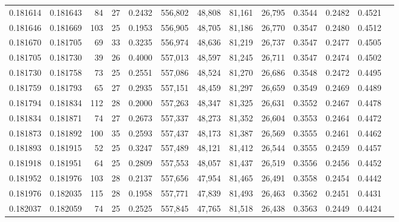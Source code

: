\begin{tabular}{rrrrrrrrrrrrr}
0.181614 & 0.181643 &  84 &  27 &                                     0.2432 & 556,802 &  48,808 &  81,161 &  26,795 & 0.3544 & 0.2482 & 0.4521 \\
0.181646 & 0.181669 & 103 &  25 &                                     0.1953 & 556,905 &  48,705 &  81,186 &  26,770 & 0.3547 & 0.2480 & 0.4512 \\
0.181670 & 0.181705 &  69 &  33 &                                     0.3235 & 556,974 &  48,636 &  81,219 &  26,737 & 0.3547 & 0.2477 & 0.4505 \\
0.181705 & 0.181730 &  39 &  26 &                                     0.4000 & 557,013 &  48,597 &  81,245 &  26,711 & 0.3547 & 0.2474 & 0.4502 \\
0.181730 & 0.181758 &  73 &  25 &                                     0.2551 & 557,086 &  48,524 &  81,270 &  26,686 & 0.3548 & 0.2472 & 0.4495 \\
0.181759 & 0.181793 &  65 &  27 &                                     0.2935 & 557,151 &  48,459 &  81,297 &  26,659 & 0.3549 & 0.2469 & 0.4489 \\
0.181794 & 0.181834 & 112 &  28 &                                     0.2000 & 557,263 &  48,347 &  81,325 &  26,631 & 0.3552 & 0.2467 & 0.4478 \\
0.181834 & 0.181871 &  74 &  27 &                                     0.2673 & 557,337 &  48,273 &  81,352 &  26,604 & 0.3553 & 0.2464 & 0.4472 \\
0.181873 & 0.181892 & 100 &  35 &                                     0.2593 & 557,437 &  48,173 &  81,387 &  26,569 & 0.3555 & 0.2461 & 0.4462 \\
0.181893 & 0.181915 &  52 &  25 &                                     0.3247 & 557,489 &  48,121 &  81,412 &  26,544 & 0.3555 & 0.2459 & 0.4457 \\
0.181918 & 0.181951 &  64 &  25 &                                     0.2809 & 557,553 &  48,057 &  81,437 &  26,519 & 0.3556 & 0.2456 & 0.4452 \\
0.181952 & 0.181976 & 103 &  28 &                                     0.2137 & 557,656 &  47,954 &  81,465 &  26,491 & 0.3558 & 0.2454 & 0.4442 \\
0.181976 & 0.182035 & 115 &  28 &                                     0.1958 & 557,771 &  47,839 &  81,493 &  26,463 & 0.3562 & 0.2451 & 0.4431 \\
0.182037 & 0.182059 &  74 &  25 &                                     0.2525 & 557,845 &  47,765 &  81,518 &  26,438 & 0.3563 & 0.2449 & 0.4424 \\

\end{tabular}
